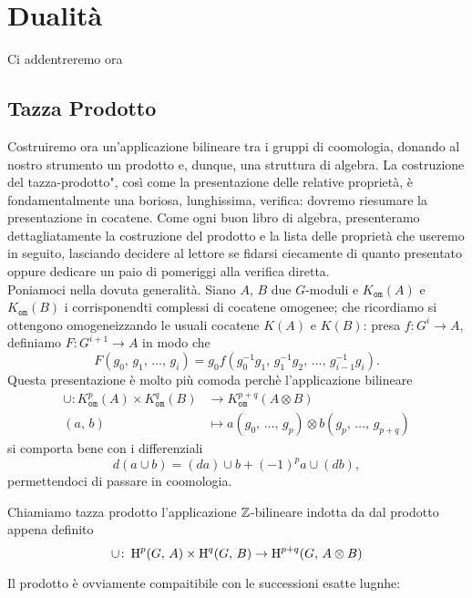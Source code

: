 \chapter{Dualità}
Ci addentreremo ora 

\section{Tazza Prodotto}
Costruiremo ora un'applicazione bilineare tra i gruppi di coomologia, donando al nostro strumento un prodotto e, dunque, una struttura di algebra. La costruzione del \leftquote tazza-prodotto", così come la presentazione delle relative proprietà, è fondamentalmente una boriosa, lunghissima, verifica: dovremo riesumare la presentazione in cocatene. Come ogni buon libro di algebra, presenteramo dettagliatamente la costruzione del prodotto e la lista delle proprietà che useremo in seguito, lasciando decidere al lettore se fidarsi ciecamente di quanto presentato oppure dedicare un paio di pomeriggi alla verifica diretta. \\

Poniamoci nella dovuta generalità. Siano $ A, \, B $ due $ G $-moduli e $ K_{\mathtt{om}}(A) $ e $ K_{\mathtt{om}}(B) $ i corrisponendti complessi di cocatene omogenee; che ricordiamo si ottengono omogeneizzando le usuali cocatene $ K(A) $ e $ K(B) $: presa $ f \colon G^i \to A $, definiamo $ F\colon G^{i+1} \to A  $ in modo che
\[ F(g_0, \, g_1, \, \dots, \, g_i) = g_0 f(g_0^{-1}g_1, \, g_1^{-1}g_2, \, \dots, \, g_{i-1}^{-1}g_i). \]
Questa presentazione è molto più comoda perchè l'applicazione bilineare
\begin{align*}
	\cup \colon K^p_{\mathtt{om}}(A) \times K^q_{\mathtt{om}}(B) &\to K_{\mathtt{om}}^{p+q}(A \otimes B)\\
	(a, \, b) & \mapsto a(g_0,\, \dots, \, g_p) \otimes b(g_p,\, \dots, \, g_{p+q})
\end{align*}
si comporta bene con i differenziali
\[ d(a \cup b) = (da) \cup b + (-1)^p a \cup (db), \]
permettendoci di passare in coomologia.

\begin{definition}
	Chiamiamo tazza prodotto l'applicazione $ \mathbb{Z} $-bilineare indotta da dal prodotto appena definito
	\[ \cup \colon \operatorname{H}^p(G, \, A) \times \operatorname{H}^q(G, \, B) \to \operatorname{H}^{p+q}(G, \, A \otimes B)  \]
\end{definition}

Il prodotto è ovviamente compaitibile con le successioni esatte lugnhe:

